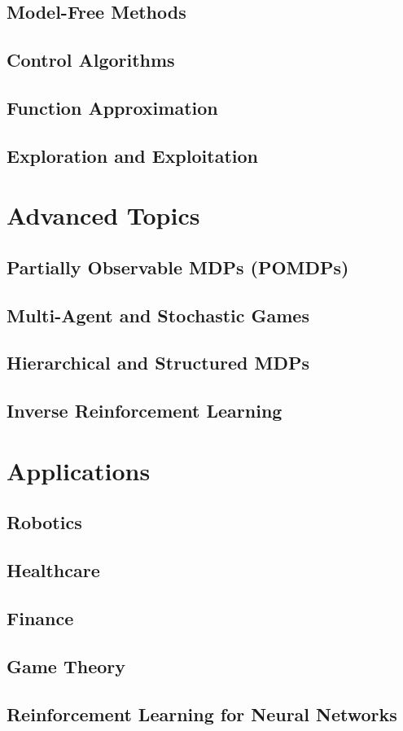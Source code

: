 \documentclass[12pt]{book}
\begin{document}
\chapter{Model-Free Methods}
\chapter{Control Algorithms}
\chapter{Function Approximation}
\chapter{Exploration and Exploitation}

\part{Advanced Topics}
\chapter{Partially Observable MDPs (POMDPs)}
\chapter{Multi-Agent and Stochastic Games}
\chapter{Hierarchical and Structured MDPs}
\chapter{Inverse Reinforcement Learning}

\part{Applications}
\chapter{Robotics}
\chapter{Healthcare}
\chapter{Finance}
\chapter{Game Theory}
\chapter{Reinforcement Learning for Neural Networks}

\backmatter
\end{document}
